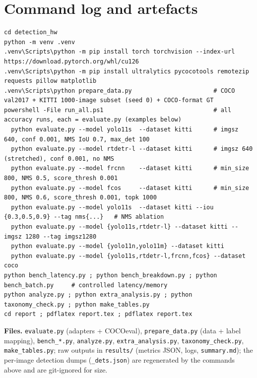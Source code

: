 \documentclass[10pt]{article}
\newcommand{\code}[1]{\texttt{\small #1}}
\begin{document}
\section{Command log and artefacts}\label{app:cmd}
\begin{lstlisting}
cd detection_hw
python -m venv .venv
.venv\Scripts\python -m pip install torch torchvision --index-url https://download.pytorch.org/whl/cu126
.venv\Scripts\python -m pip install ultralytics pycocotools remotezip requests pillow matplotlib
.venv\Scripts\python prepare_data.py                       # COCO val2017 + KITTI 1000-image subset (seed 0) + COCO-format GT
powershell -File run_all.ps1                               # all accuracy runs, each = evaluate.py (examples below)
  python evaluate.py --model yolo11s  --dataset kitti      # imgsz 640, conf 0.001, NMS IoU 0.7, max_det 100
  python evaluate.py --model rtdetr-l --dataset kitti      # imgsz 640 (stretched), conf 0.001, no NMS
  python evaluate.py --model frcnn    --dataset kitti      # min_size 800, NMS 0.5, score_thresh 0.001
  python evaluate.py --model fcos     --dataset kitti      # min_size 800, NMS 0.6, score_thresh 0.001, topk 1000
  python evaluate.py --model yolo11s  --dataset kitti --iou {0.3,0.5,0.9} --tag nms{...}   # NMS ablation
  python evaluate.py --model {yolo11s,rtdetr-l} --dataset kitti --imgsz 1280 --tag imgsz1280
  python evaluate.py --model {yolo11n,yolo11m} --dataset kitti
  python evaluate.py --model {yolo11s,rtdetr-l,frcnn,fcos} --dataset coco
python bench_latency.py ; python bench_breakdown.py ; python bench_batch.py     # controlled latency/memory
python analyze.py ; python extra_analysis.py ; python taxonomy_check.py ; python make_tables.py
cd report ; pdflatex report.tex ; pdflatex report.tex
\end{lstlisting}
\textbf{Files.} \code{evaluate.py} (adapters + COCOeval), \code{prepare\_data.py} (data + label mapping), \code{bench\_*.py}, \code{analyze.py}, \code{extra\_analysis.py}, \code{taxonomy\_check.py}, \code{make\_tables.py}; raw outputs in \code{results/} (metrics JSON, logs, \code{summary.md}); the per-image detection dumps (\code{*\_dets.json}) are regenerated by the commands above and are git-ignored for size.
\end{document}
